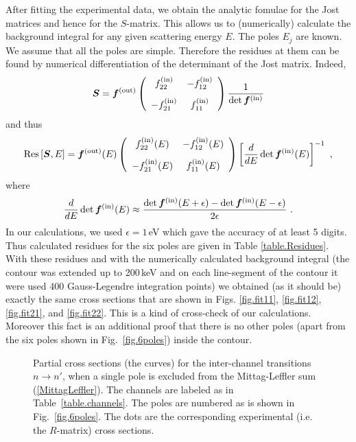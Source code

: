 \documentclass[12pt]{article}
\begin{document}
After fitting the experimental data, we obtain the analytic fomulae for the
Jost matrices and hence for the $S$-matrix. This allows us to (numerically)
calculate the background integral for any given scattering energy $E$. The
poles $E_j$ are known. We assume that all the poles are simple. Therefore the
residues at them can be found by numerical differentiation of the determinant of
the Jost matrix. Indeed,
\begin{equation}
\label{SmatrixExplicit}
    \bm{S}=\bm{f}^{(\rm out)}\left(
    \begin{array}{cc}
    f^{(\rm in)}_{22} & -f^{(\rm in)}_{12} \\[3mm]
    -f^{(\rm in)}_{21} & f^{(\rm in)}_{11}
    \end{array}\right)
    \frac{1}{\det \bm{f}^{(\rm in)}}
\end{equation}
and thus
\begin{equation}
\label{ResidueExplicit}
    {\rm Res}\,[\bm{S},E]=\bm{f}^{(\rm out)}(E)\left(
    \begin{array}{cc}
    f^{(\rm in)}_{22}(E) & -f^{(\rm in)}_{12}(E) \\[3mm]
    -f^{(\rm in)}_{21}(E) & f^{(\rm in)}_{11}(E)
    \end{array}\right)
    \left[\frac{d}{dE}\det \bm{f}^{(\rm in)}(E)\right]^{-1}\ ,
\end{equation}
where
\begin{equation}
\label{DerivativeExplicit}
   \frac{d}{dE}\det \bm{f}^{(\rm in)}(E)\approx
   \frac{\det \bm{f}^{(\rm in)}(E+\epsilon)-\det \bm{f}^{(\rm in)}(E-\epsilon)}
   {2\epsilon}\ .
\end{equation}
In our calculations, we used $\epsilon=1$\,eV which gave the
accuracy of at least 5 digits. Thus calculated residues for the six poles are
given in Table \ref{table.Residues}. With these residues and with the
numerically calculated background integral (the contour was extended up to
200\,keV and on each line-segment of the contour it were used 400
Gauss-Legendre integration points) we obtained (as it should be) exactly the
same cross sections that are shown in Figs.
\ref{fig.fit11}, \ref{fig.fit12}, \ref{fig.fit21}, and \ref{fig.fit22}.
This is a kind of cross-check of our calculations. Moreover this fact is an
additional proof that there is no other poles (apart from the six poles shown
in Fig.~\ref{fig.6poles}) inside the contour.

\begin{figure}
\centerline{}
\caption{\sf
Partial cross sections (the curves) for the inter-channel transitions $n\to
n'$, when a
single pole is excluded from the Mittag-Leffler sum (\ref{MittagLeffler}). The
channels are labeled as in Table~\ref{table.channels}. The poles are numbered
as is shown in Fig.~\ref{fig.6poles}. The dots are the corresponding
experimental (i.e. the $R$-matrix) cross sections.
}
\label{fig.MLexcl}
\end{figure}
\end{document}
